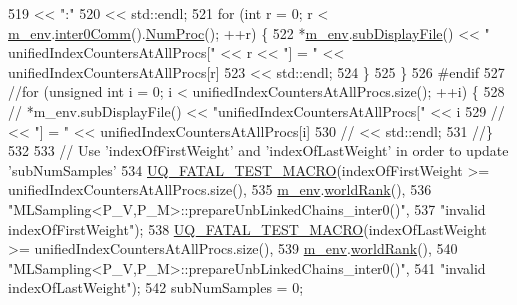 \begin{DoxyCode}
519                             << \textcolor{stringliteral}{":"}
520                             << std::endl;
521     \textcolor{keywordflow}{for} (\textcolor{keywordtype}{int} r = 0; r < \hyperlink{class_q_u_e_s_o_1_1_m_l_sampling_a13f1ca4fe9f94822fe572a743eaced1d}{m\_env}.\hyperlink{class_q_u_e_s_o_1_1_base_environment_a689e4d140c74d495d97eb498714a4b82}{inter0Comm}().\hyperlink{class_q_u_e_s_o_1_1_mpi_comm_aa780721ae0fdeabc5a15e04cb0cad964}{NumProc}(); ++r) \{
522       *\hyperlink{class_q_u_e_s_o_1_1_m_l_sampling_a13f1ca4fe9f94822fe572a743eaced1d}{m\_env}.\hyperlink{class_q_u_e_s_o_1_1_base_environment_a8a0064746ae8dddfece4229b9ad374d6}{subDisplayFile}() << \textcolor{stringliteral}{"  unifiedIndexCountersAtAllProcs["} << r << \textcolor{stringliteral}{"] = "} << 
      unifiedIndexCountersAtAllProcs[r]
523                               << std::endl;
524     \}
525   \}
526 \textcolor{preprocessor}{#endif}
527 \textcolor{preprocessor}{}  \textcolor{comment}{//for (unsigned int i = 0; i < unifiedIndexCountersAtAllProcs.size(); ++i) \{}
528   \textcolor{comment}{//  *m\_env.subDisplayFile() << "unifiedIndexCountersAtAllProcs[" << i}
529   \textcolor{comment}{//                          << "] = " << unifiedIndexCountersAtAllProcs[i]}
530   \textcolor{comment}{//                          << std::endl;}
531   \textcolor{comment}{//\}}
532 
533   \textcolor{comment}{// Use 'indexOfFirstWeight' and 'indexOfLastWeight' in order to update 'subNumSamples'}
534   \hyperlink{_defines_8h_a56d63d18d0a6d45757de47fcc06f574d}{UQ\_FATAL\_TEST\_MACRO}(indexOfFirstWeight >= unifiedIndexCountersAtAllProcs.size(),
535                       \hyperlink{class_q_u_e_s_o_1_1_m_l_sampling_a13f1ca4fe9f94822fe572a743eaced1d}{m\_env}.\hyperlink{class_q_u_e_s_o_1_1_base_environment_a78b57112bbd0e6dd0e8afec00b40ffa7}{worldRank}(),
536                       \textcolor{stringliteral}{"MLSampling<P\_V,P\_M>::prepareUnbLinkedChains\_inter0()"},
537                       \textcolor{stringliteral}{"invalid indexOfFirstWeight"});
538   \hyperlink{_defines_8h_a56d63d18d0a6d45757de47fcc06f574d}{UQ\_FATAL\_TEST\_MACRO}(indexOfLastWeight >= unifiedIndexCountersAtAllProcs.size(),
539                       \hyperlink{class_q_u_e_s_o_1_1_m_l_sampling_a13f1ca4fe9f94822fe572a743eaced1d}{m\_env}.\hyperlink{class_q_u_e_s_o_1_1_base_environment_a78b57112bbd0e6dd0e8afec00b40ffa7}{worldRank}(),
540                       \textcolor{stringliteral}{"MLSampling<P\_V,P\_M>::prepareUnbLinkedChains\_inter0()"},
541                       \textcolor{stringliteral}{"invalid indexOfLastWeight"});
542   subNumSamples = 0;

\end{DoxyCode}
